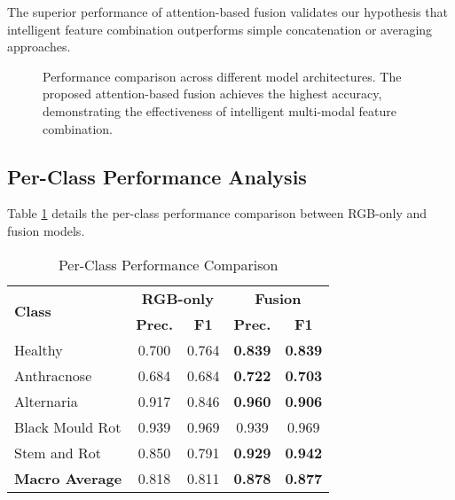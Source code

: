 \documentclass[conference]{IEEEtran}
\begin{document}
The superior performance of attention-based fusion validates our hypothesis that intelligent feature combination outperforms simple concatenation or averaging approaches.

\begin{figure}[htbp]
\centering
{}
\caption{Performance comparison across different model architectures. The proposed attention-based fusion achieves the highest accuracy, demonstrating the effectiveness of intelligent multi-modal feature combination.}
\label{fig:performance_comparison}
\end{figure}

\subsection{Per-Class Performance Analysis}

Table \ref{tab:per_class} details the per-class performance comparison between RGB-only and fusion models.

\begin{table}[htbp]
\caption{Per-Class Performance Comparison}
\begin{center}
\begin{tabular}{|l|c|c|c|c|}
\hline
\multirow{2}{*}{\textbf{Class}} & \multicolumn{2}{c|}{\textbf{RGB-only}} & \multicolumn{2}{c|}{\textbf{Fusion}} \\
\cline{2-5}
 & \textbf{Prec.} & \textbf{F1} & \textbf{Prec.} & \textbf{F1} \\
\hline
Healthy & 0.700 & 0.764 & \textbf{0.839} & \textbf{0.839} \\
Anthracnose & 0.684 & 0.684 & \textbf{0.722} & \textbf{0.703} \\
Alternaria & 0.917 & 0.846 & \textbf{0.960} & \textbf{0.906} \\
Black Mould Rot & 0.939 & 0.969 & 0.939 & 0.969 \\
Stem and Rot & 0.850 & 0.791 & \textbf{0.929} & \textbf{0.942} \\
\hline
\textbf{Macro Average} & 0.818 & 0.811 & \textbf{0.878} & \textbf{0.877} \\
\hline
\end{tabular}
\label{tab:per_class}
\end{center}
\end{table}
\end{document}
